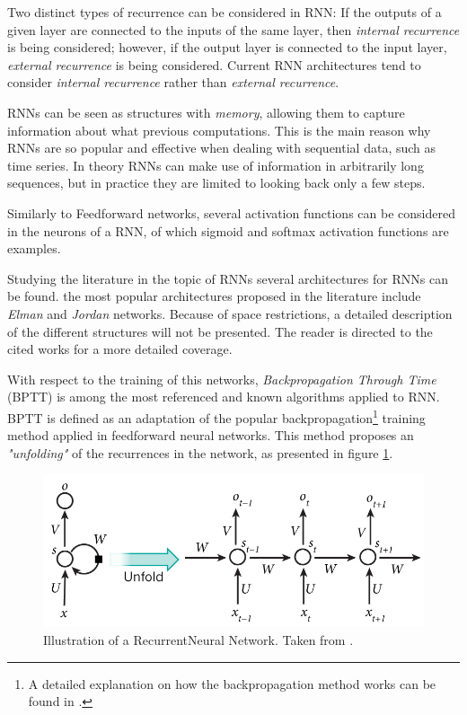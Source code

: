 \documentclass[9pt,journal,compsoc]{IEEEtran}
\begin{document}
Two distinct types of recurrence can be considered in RNN: If the outputs of a given layer are connected to the inputs of the same layer, then \emph{internal recurrence} is being considered; however, if the output layer is connected to the input layer, \emph{external recurrence} is being considered. Current RNN architectures tend to consider \emph{internal recurrence} rather than \emph{external recurrence}.

RNNs can be seen as structures with \emph{memory}, allowing them to capture information about what previous computations. This is the main reason why RNNs are so popular and effective when dealing with sequential data, such as time series. In theory RNNs can make use of information in arbitrarily long sequences, but in practice they are limited to looking back only a few steps.

Similarly to Feedforward networks, several activation functions can be considered in the neurons of a RNN, of which sigmoid and softmax activation functions are examples.

Studying the literature in the topic of RNNs several architectures for RNNs can be found. the most popular architectures proposed in the literature include \emph{Elman}\cite{elman1990finding,elman1991distributed} and \emph{Jordan}\cite{jordan1997serial} networks. Because of space restrictions, a detailed description of the different structures will not be presented. The reader is directed to the cited works for a more detailed coverage.

With respect to the training of this networks, \emph{Backpropagation Through Time} (BPTT) is among the most referenced and known algorithms applied to RNN. BPTT is defined as an adaptation of the popular backpropagation\footnote{A detailed explanation on how the backpropagation method works can be found in \cite{nielsen2015neural}.} training method applied in feedforward neural networks. This method proposes an \emph{"unfolding"} of the recurrences in the network, as presented in figure \ref{recurrent_ann_training}. 

\begin{figure}[ht]
	\centering
	\includegraphics[scale=0.25]{recurrent_ann_training.jpg}
	\caption{Illustration of a RecurrentNeural Network. Taken from \cite{deep2015recurrent}.}
	\label{recurrent_ann_training}
\end{figure}
\end{document}

